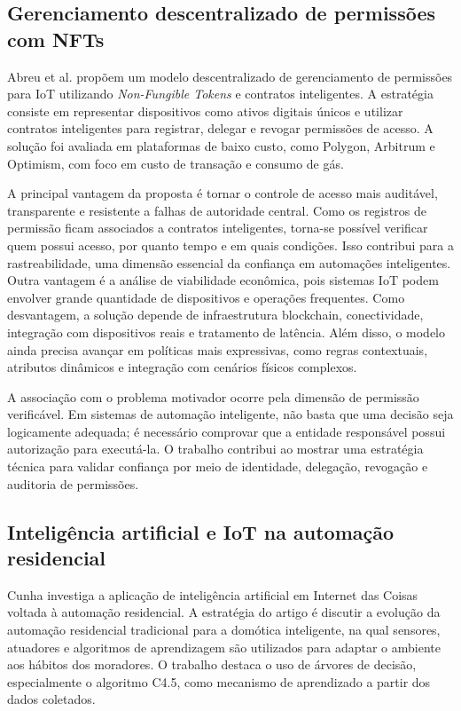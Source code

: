 \documentclass[12pt]{article}
\begin{document}
\subsection{Gerenciamento descentralizado de permissões com NFTs}

Abreu et al. \cite{abreu2025} propõem um modelo descentralizado de gerenciamento de permissões para IoT utilizando \textit{Non-Fungible Tokens} e contratos inteligentes. A estratégia consiste em representar dispositivos como ativos digitais únicos e utilizar contratos inteligentes para registrar, delegar e revogar permissões de acesso. A solução foi avaliada em plataformas de baixo custo, como Polygon, Arbitrum e Optimism, com foco em custo de transação e consumo de gás.

A principal vantagem da proposta é tornar o controle de acesso mais auditável, transparente e resistente a falhas de autoridade central. Como os registros de permissão ficam associados a contratos inteligentes, torna-se possível verificar quem possui acesso, por quanto tempo e em quais condições. Isso contribui para a rastreabilidade, uma dimensão essencial da confiança em automações inteligentes. Outra vantagem é a análise de viabilidade econômica, pois sistemas IoT podem envolver grande quantidade de dispositivos e operações frequentes. Como desvantagem, a solução depende de infraestrutura blockchain, conectividade, integração com dispositivos reais e tratamento de latência. Além disso, o modelo ainda precisa avançar em políticas mais expressivas, como regras contextuais, atributos dinâmicos e integração com cenários físicos complexos.

A associação com o problema motivador ocorre pela dimensão de permissão verificável. Em sistemas de automação inteligente, não basta que uma decisão seja logicamente adequada; é necessário comprovar que a entidade responsável possui autorização para executá-la. O trabalho contribui ao mostrar uma estratégia técnica para validar confiança por meio de identidade, delegação, revogação e auditoria de permissões.

\subsection{Inteligência artificial e IoT na automação residencial}

Cunha \cite{cunha2018} investiga a aplicação de inteligência artificial em Internet das Coisas voltada à automação residencial. A estratégia do artigo é discutir a evolução da automação residencial tradicional para a domótica inteligente, na qual sensores, atuadores e algoritmos de aprendizagem são utilizados para adaptar o ambiente aos hábitos dos moradores. O trabalho destaca o uso de árvores de decisão, especialmente o algoritmo C4.5, como mecanismo de aprendizado a partir dos dados coletados.
\end{document}
